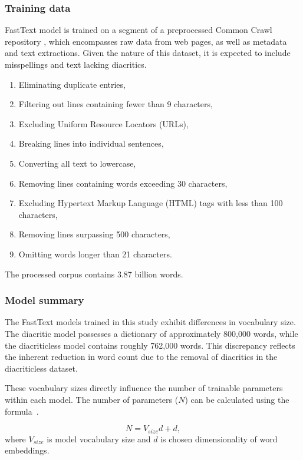 \subsubsection{Training data}

FastText model is trained on a segment of a preprocessed Common Crawl repository \cite{commoncrawl}, which encompasses raw data from web pages, as well as metadata and text extractions.
Given the nature of this dataset, it is expected to include misspellings and text lacking diacritics.

\begin{enumerate}
  \item Eliminating duplicate entries,
  \item Filtering out lines containing fewer than 9 characters,
  \item Excluding Uniform Resource Locators (URLs),
  \item Breaking lines into individual sentences,
  \item Converting all text to lowercase,
  \item Removing lines containing words exceeding 30 characters,
  \item Excluding Hypertext Markup Language (HTML) tags with less than 100 characters,
  \item Removing lines surpassing 500 characters,
  \item Omitting words longer than 21 characters.
\end{enumerate}

The processed corpus contains 3.87 billion words.

\subsubsection{Model summary}

The FastText models trained in this study exhibit differences in vocabulary size.
The diacritic model possesses a dictionary of approximately 800,000 words, while the diacriticless model contains roughly 762,000 words.
This discrepancy reflects the inherent reduction in word count due to the removal of diacritics in the diacriticless dataset.

These vocabulary sizes directly influence the number of trainable parameters within each model.
The number of parameters ($N$) can be calculated using the formula~.

\begin{equation}
 N = V_{size}d + d,
  \label{eq:cbow_parameters}
\end{equation}
where $V_{size}$ is model vocabulary size and $d$ is chosen dimensionality of word embeddings.
  
